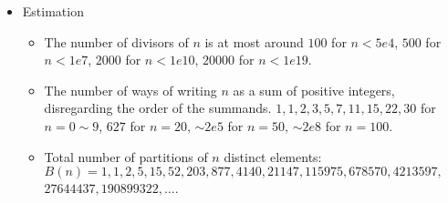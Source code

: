 \begin{itemize}
\item Estimation

\begin{itemize}
    \itemsep-0.5em
    \item The number of divisors of $n$ is at most around $100$ for $n<5e4$, $500$ for $n<1e7$, $2000$ for $n<1e10$, $20000$ for $n<1e19$.
    \item The number of ways of writing $n$ as a sum of positive integers, disregarding the order of the summands. $1, 1, 2, 3, 5, 7, 11, 15, 22, 30$ for $n=0\sim 9$, $627$ for $n=20$, $\sim 2e5$ for $n=50$, $\sim 2e8$ for $n=100$.
    \item Total number of partitions of $n$ distinct elements: $B(n)=1, 1, 2, 5, 15, 52, 203, 877, 4140, 21147, 115975, 678570, 4213597,$\\
    $27644437, 190899322, \ldots$.
\end{itemize}

\end{itemize}
